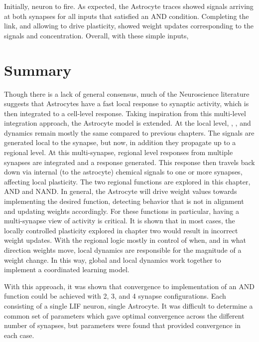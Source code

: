 
Initially, 
neuron to fire. As expected, the Astrocyte traces showed \dser signals
arriving at both synapses for all inputs that satisfied an AND
condition. Completing the link, and allowing \ca to drive plasticity, showed
weight updates corresponding to the \dser signals and \ca
concentration. Overall, with these simple inputs, 

\section{Summary}
Though there is a lack of general consensus, much of the Neuroscience literature
suggests that Astrocytes have a fast local response to synaptic activity, which
is then integrated to a cell-level response. Taking inspiration from this
multi-level integration approach, the Astrocyte model is extended. At the local
level, \ipt, \kp, and \ca dynamics remain mostly the same compared to previous
chapters. The \ca signals are generated local to the synapse, but now, in
addition they propagate up to a regional level. At this multi-synapse, regional
level \ca responses from multiple synapses are integrated and a response
generated. This response then travels back down via internal (to the astrocyte)
chemical signals to one or more synapses, affecting local plasticity. The two
regional functions are explored in this chapter, AND and NAND. In general, the
Astrocyte will drive weight values towards implementing the desired function,
detecting behavior that is not in alignment and updating weights
accordingly. For these functions in particular, having a multi-synapse view of
activity is critical. It is shown that in most cases, the locally controlled
plasticity explored in chapter two would result in incorrect weight
updates. With the regional logic mostly in control of when, and in what
direction weights move, local dynamics are responsible for the magnitude of a
weight change. In this way, global and local dynamics work together to implement
a coordinated learning model.

With this approach, it was shown that convergence to implementation of an AND
function could be achieved with 2, 3, and 4 synapse configurations. Each
consisting of a single LIF neuron, single Astrocyte. It was difficult to
determine a common set of parameters which gave optimal convergence across the
different number of synapses, but parameters were found that provided
convergence in each case.
